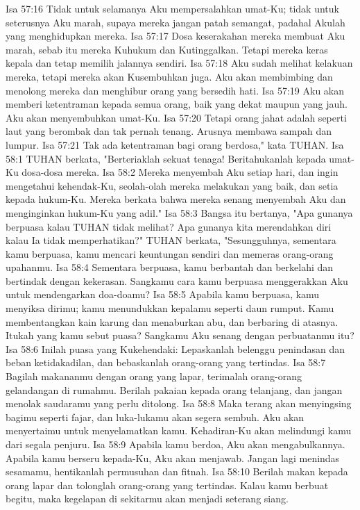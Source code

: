 Isa 57:16  Tidak untuk selamanya Aku mempersalahkan umat-Ku; tidak untuk seterusnya Aku marah, supaya mereka jangan patah semangat, padahal Akulah yang menghidupkan mereka.
Isa 57:17  Dosa keserakahan mereka membuat Aku marah, sebab itu mereka Kuhukum dan Kutinggalkan. Tetapi mereka keras kepala dan tetap memilih jalannya sendiri.
Isa 57:18  Aku sudah melihat kelakuan mereka, tetapi mereka akan Kusembuhkan juga. Aku akan membimbing dan menolong mereka dan menghibur orang yang bersedih hati.
Isa 57:19  Aku akan memberi ketentraman kepada semua orang, baik yang dekat maupun yang jauh. Aku akan menyembuhkan umat-Ku.
Isa 57:20  Tetapi orang jahat adalah seperti laut yang berombak dan tak pernah tenang. Arusnya membawa sampah dan lumpur.
Isa 57:21  Tak ada ketentraman bagi orang berdosa," kata TUHAN.
Isa 58:1  TUHAN berkata, "Berteriaklah sekuat tenaga! Beritahukanlah kepada umat-Ku dosa-dosa mereka.
Isa 58:2  Mereka menyembah Aku setiap hari, dan ingin mengetahui kehendak-Ku, seolah-olah mereka melakukan yang baik, dan setia kepada hukum-Ku. Mereka berkata bahwa mereka senang menyembah Aku dan menginginkan hukum-Ku yang adil."
Isa 58:3  Bangsa itu bertanya, "Apa gunanya berpuasa kalau TUHAN tidak melihat? Apa gunanya kita merendahkan diri kalau Ia tidak memperhatikan?" TUHAN berkata, "Sesungguhnya, sementara kamu berpuasa, kamu mencari keuntungan sendiri dan memeras orang-orang upahanmu.
Isa 58:4  Sementara berpuasa, kamu berbantah dan berkelahi dan bertindak dengan kekerasan. Sangkamu cara kamu berpuasa menggerakkan Aku untuk mendengarkan doa-doamu?
Isa 58:5  Apabila kamu berpuasa, kamu menyiksa dirimu; kamu menundukkan kepalamu seperti daun rumput. Kamu membentangkan kain karung dan menaburkan abu, dan berbaring di atasnya. Itukah yang kamu sebut puasa? Sangkamu Aku senang dengan perbuatanmu itu?
Isa 58:6  Inilah puasa yang Kukehendaki: Lepaskanlah belenggu penindasan dan beban ketidakadilan, dan bebaskanlah orang-orang yang tertindas.
Isa 58:7  Bagilah makananmu dengan orang yang lapar, terimalah orang-orang gelandangan di rumahmu. Berilah pakaian kepada orang telanjang, dan jangan menolak saudaramu yang perlu ditolong.
Isa 58:8  Maka terang akan menyingsing bagimu seperti fajar, dan luka-lukamu akan segera sembuh. Aku akan menyertaimu untuk menyelamatkan kamu. Kehadiran-Ku akan melindungi kamu dari segala penjuru.
Isa 58:9  Apabila kamu berdoa, Aku akan mengabulkannya. Apabila kamu berseru kepada-Ku, Aku akan menjawab. Jangan lagi menindas sesamamu, hentikanlah permusuhan dan fitnah.
Isa 58:10  Berilah makan kepada orang lapar dan tolonglah orang-orang yang tertindas. Kalau kamu berbuat begitu, maka kegelapan di sekitarmu akan menjadi seterang siang.
